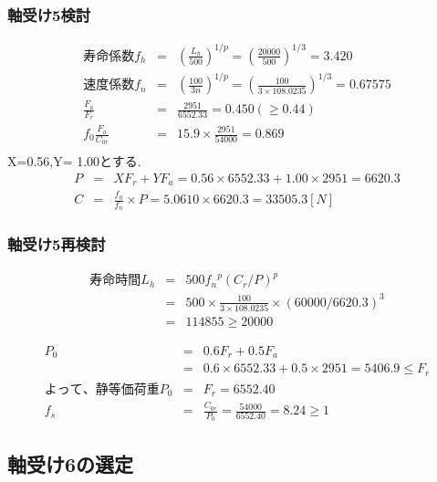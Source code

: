 \subsubsection{軸受け5検討}
\begin{eqnarray}
寿命係数f_h &=& \left( \frac{L_h}{500} \right)^{1/p} = \left( \frac{20000}{500} \right)^{1/3} = 3.420\\
速度係数f_n &=& \left( \frac{100}{3n} \right)^{1/p} = \left( \frac{100}{3 \times 108.0235} \right)^{1/3} = 0.67575\\
\frac{F_a}{F_r} &=& \frac{2951}{6552.33} = 0.450(\geq 0.44)\\
f_0\frac{F_a}{C_{0r}}&=& 15.9 \times \frac{2951}{54000} = 0.869\\
\end{eqnarray}
X=0.56,Y= 1.00とする.
\begin{eqnarray}
P &=& XF_r+YF_a = 0.56 \times 6552.33 + 1.00 \times 2951 = 6620.3\\
C &=& \frac{f_h}{f_n} \times P = 5.0610 \times 6620.3 = 33505.3 [N]
\end{eqnarray}

\subsubsection{軸受け5再検討}
\begin{eqnarray}
寿命時間L_h &=& 500{f_n}^p(C_r/P)^p\\
           &=& 500 \times \frac{100}{3 \times 108.0235} \times (60000/6620.3)^3\\
           &=& 114855 \geq 20000
\end{eqnarray}


\begin{eqnarray}
P_0&=&0.6F_r+0.5F_a\\
   &=&0.6 \times 6552.33 + 0.5 \times 2951 = 5406.9 \leq F_r\\
よって、静等価荷重P_0 &=& F_r = 6552.40\\
f_s &=& \frac{C_{0r}}{P_0} = \frac{54000}{6552.40} = 8.24\geq 1
\end{eqnarray}


\newpage
\subsection{軸受け6の選定}

